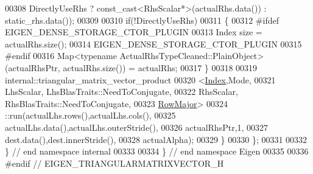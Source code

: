 \begin{DoxyCode}
00308         DirectlyUseRhs ? \textcolor{keyword}{const\_cast<}RhsScalar*\textcolor{keyword}{>}(actualRhs.data()) : static\_rhs.data());
00309 
00310     \textcolor{keywordflow}{if}(!DirectlyUseRhs)
00311     \{
00312 \textcolor{preprocessor}{      #ifdef EIGEN\_DENSE\_STORAGE\_CTOR\_PLUGIN}
00313       Index size = actualRhs.size();
00314       EIGEN\_DENSE\_STORAGE\_CTOR\_PLUGIN
00315 \textcolor{preprocessor}{      #endif}
00316       Map<typename ActualRhsTypeCleaned::PlainObject>(actualRhsPtr, actualRhs.size()) = actualRhs;
00317     \}
00318 
00319     internal::triangular\_matrix\_vector\_product
00320       <\hyperlink{namespace_eigen_a62e77e0933482dafde8fe197d9a2cfde}{Index},Mode,
00321        LhsScalar, LhsBlasTraits::NeedToConjugate,
00322        RhsScalar, RhsBlasTraits::NeedToConjugate,
00323        \hyperlink{group__enums_ggaacded1a18ae58b0f554751f6cdf9eb13acfcde9cd8677c5f7caf6bd603666aae3}{RowMajor}>
00324       ::run(actualLhs.rows(),actualLhs.cols(),
00325             actualLhs.data(),actualLhs.outerStride(),
00326             actualRhsPtr,1,
00327             dest.data(),dest.innerStride(),
00328             actualAlpha);
00329   \}
00330 \};
00331 
00332 \} \textcolor{comment}{// end namespace internal}
00333 
00334 \} \textcolor{comment}{// end namespace Eigen}
00335 
00336 \textcolor{preprocessor}{#endif // EIGEN\_TRIANGULARMATRIXVECTOR\_H}
\end{DoxyCode}

